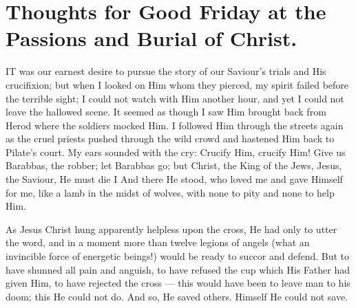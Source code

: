 \chapter{Thoughts for Good Friday at the Passions and Burial of Christ.}

IT was our earnest desire to pursue the story 
of our Saviour's trials and His crucifixion; 
but when I looked on Him whom they pierced, 
my spirit failed before the terrible sight; I 
could not watch with Him another hour, and yet 
I could not leave the hallowed scene. It seemed 
as though I saw Him brought back from Herod 
where the soldiers mocked Him. I followed 
Him through the streets again as the cruel 
priests pushed through the wild crowd and 
hastened Him back to Pilate's court. My ears 
sounded with the cry: Crucify Him, crucify 
Him! Give us Barabbas, the robber; let Barabbas
go; but Christ, the King of the Jews, Jesus, 
the Saviour, He must die I And there He stood, 
who loved me and gave Himself for me, like a 
lamb in the midst of wolves, with none to pity 
and none to help Him. 

As Jesus Christ hung apparently helpless 
upon the cross, He had only to utter the word,
and in a moment more than twelve legions of 
angels (what an invincible force of energetic 
beings!) would be ready to succor and defend. 
But to have shunned all pain and anguish, to 
have refused the cup which His Father had 
given Him, to have rejected the cross — this 
would have been to leave man to his doom; this 
He could not do. And so, He saved others. 
Himself He could not save. 

